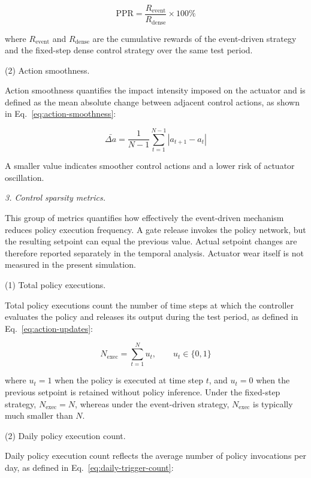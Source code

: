 \documentclass[preprint,12pt]{elsarticle}
\begin{document}
\[
\mathrm{PPR} = \frac{R_{\text{event}}}{R_{\text{dense}}} \times 100\% \tag{28}\label{eq:ppr}
\]

\noindent where \(R_{\text{event}}\) and \(R_{\text{dense}}\) are the cumulative rewards of the event-driven strategy and the fixed-step dense control strategy over the same test period.

\par\smallskip
\noindent (2) Action smoothness.
\par\nobreak\noindent Action smoothness quantifies the impact intensity imposed on the actuator and is defined as the mean absolute change between adjacent control actions, as shown in Eq.~\eqref{eq:action-smoothness}:

\[
\bar{\Delta a} = \frac{1}{N-1} \sum_{t=1}^{N-1} |a_{t+1} - a_t| \tag{29}\label{eq:action-smoothness}
\]

A smaller value indicates smoother control actions and a lower risk of actuator oscillation.

\par\medskip
\noindent\textit{3. Control sparsity metrics.}\label{control-sparsity-metrics}
\par\smallskip

This group of metrics quantifies how effectively the event-driven mechanism reduces policy execution frequency. A gate release invokes the policy network, but the resulting setpoint can equal the previous value. Actual setpoint changes are therefore reported separately in the temporal analysis. Actuator wear itself is not measured in the present simulation.

\par\smallskip
\noindent (1) Total policy executions.
\par\nobreak\noindent Total policy executions count the number of time steps at which the controller evaluates the policy and releases its output during the test period, as defined in Eq.~\eqref{eq:action-updates}:

\[
N_{\text{exec}} = \sum_{t=1}^{N} u_t, \qquad u_t\in\{0,1\} \tag{30}\label{eq:action-updates}
\]

\noindent where \(u_t=1\) when the policy is executed at time step \(t\), and \(u_t=0\) when the previous setpoint is retained without policy inference. Under the fixed-step strategy, \(N_{\text{exec}}=N\), whereas under the event-driven strategy, \(N_{\text{exec}}\) is typically much smaller than \(N\).

\par\smallskip
\noindent (2) Daily policy execution count.
\par\nobreak\noindent Daily policy execution count reflects the average number of policy invocations per day, as defined in Eq.~\eqref{eq:daily-trigger-count}:
\end{document}
